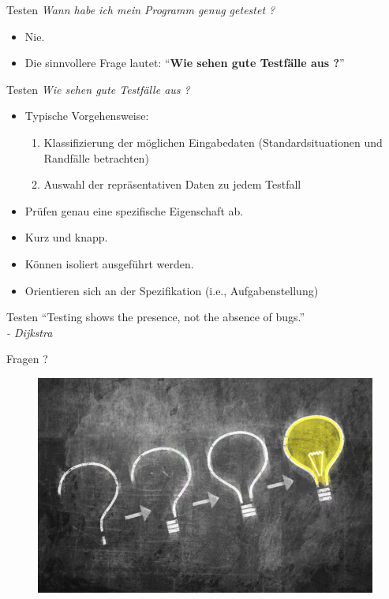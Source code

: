 \documentclass[18pt]{beamer}
\newcommand{\quotes}[1]{``#1''}
\begin{document}
\begin{frame}{Testen}
    \textit{Wann habe ich mein Programm genug getestet ?}
    \pause
    \begin{itemize}
        \item Nie.
        \pause
        \item Die sinnvollere Frage lautet: \quotes{\textbf{Wie sehen gute Testfälle aus ?}}
    \end{itemize}
\end{frame}

\begin{frame}{Testen}
    \textit{Wie sehen gute Testfälle aus ?}
    \pause
    \begin{itemize}
        \item Typische Vorgehensweise:
        \begin{enumerate}
            \item Klassifizierung der möglichen Eingabedaten (Standardsituationen und Randfälle betrachten)
            \item Auswahl der repräsentativen Daten zu jedem Testfall
        \end{enumerate}

        \item Prüfen genau eine spezifische Eigenschaft ab.
        \item Kurz und knapp.
        \item Können isoliert ausgeführt werden.
        \item Orientieren sich an der Spezifikation (i.e., Aufgabenstellung)
    \end{itemize}
\end{frame}


\begin{frame}{Testen}
    \Large{\quotes{Testing shows the presence, not the absence of bugs.}}\\
    \vspace{.4in}
    \textit{- Dijkstra}
\end{frame}



\begin{frame}{Fragen ?}
    \begin{figure}
        \includegraphics[scale=.5]{img/question_to_idea.jpg}
    \end{figure}
\end{frame}
\end{document}
